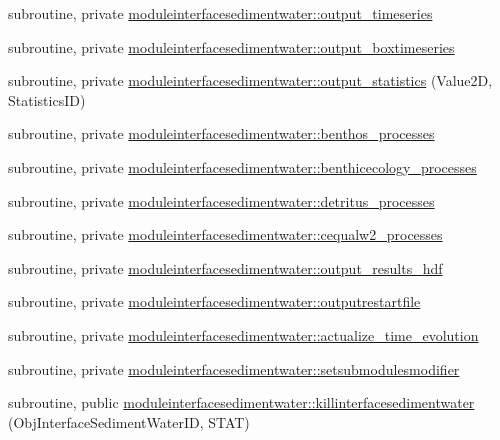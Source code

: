 \begin{DoxyCompactItemize}
\item 
subroutine, private \mbox{\hyperlink{namespacemoduleinterfacesedimentwater_a8768df3235fac76ac345a9a68b7e7437}{moduleinterfacesedimentwater\+::output\+\_\+timeseries}}
\item 
subroutine, private \mbox{\hyperlink{namespacemoduleinterfacesedimentwater_ae4c4f73744fd3c2e241e675f6fc1d839}{moduleinterfacesedimentwater\+::output\+\_\+boxtimeseries}}
\item 
subroutine, private \mbox{\hyperlink{namespacemoduleinterfacesedimentwater_aa57d7b6cd225347d61e24202cb55d26b}{moduleinterfacesedimentwater\+::output\+\_\+statistics}} (Value2D, Statistics\+ID)
\item 
subroutine, private \mbox{\hyperlink{namespacemoduleinterfacesedimentwater_a6fc6699ed26c842c7951c9c436867a65}{moduleinterfacesedimentwater\+::benthos\+\_\+processes}}
\item 
subroutine, private \mbox{\hyperlink{namespacemoduleinterfacesedimentwater_a474f4e07894c361e5aaa94f48648a6b1}{moduleinterfacesedimentwater\+::benthicecology\+\_\+processes}}
\item 
subroutine, private \mbox{\hyperlink{namespacemoduleinterfacesedimentwater_a2327d7638eb1058aa8b3f9f188eda1c9}{moduleinterfacesedimentwater\+::detritus\+\_\+processes}}
\item 
subroutine, private \mbox{\hyperlink{namespacemoduleinterfacesedimentwater_aa03ae3c533041dd1f82ad0796e923671}{moduleinterfacesedimentwater\+::cequalw2\+\_\+processes}}
\item 
subroutine, private \mbox{\hyperlink{namespacemoduleinterfacesedimentwater_ab623073c171ba3d532b1c1ec393f91b6}{moduleinterfacesedimentwater\+::output\+\_\+results\+\_\+hdf}}
\item 
subroutine, private \mbox{\hyperlink{namespacemoduleinterfacesedimentwater_a25afe0c9ade674061e39cc5e6456dd28}{moduleinterfacesedimentwater\+::outputrestartfile}}
\item 
subroutine, private \mbox{\hyperlink{namespacemoduleinterfacesedimentwater_a82f97321667d905db79c85b574f47802}{moduleinterfacesedimentwater\+::actualize\+\_\+time\+\_\+evolution}}
\item 
subroutine, private \mbox{\hyperlink{namespacemoduleinterfacesedimentwater_ae902470f5fe9f7c4442249a86b00147e}{moduleinterfacesedimentwater\+::setsubmodulesmodifier}}
\item 
subroutine, public \mbox{\hyperlink{namespacemoduleinterfacesedimentwater_a692292c5eb96b9de096ef130fafc0962}{moduleinterfacesedimentwater\+::killinterfacesedimentwater}} (Obj\+Interface\+Sediment\+Water\+ID, S\+T\+AT)

\end{DoxyCompactItemize}

